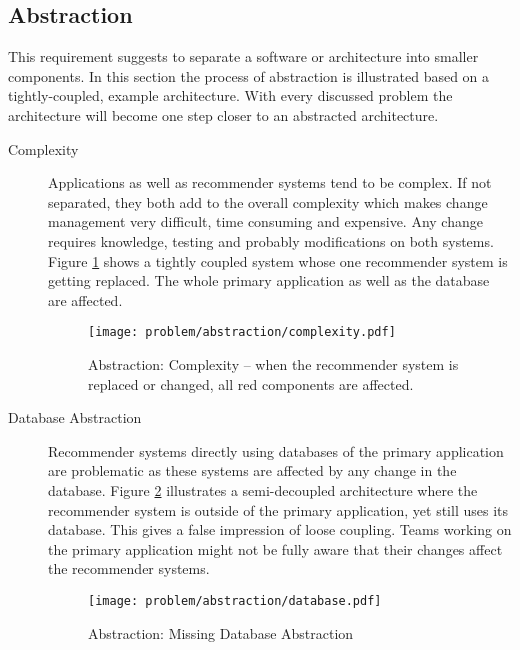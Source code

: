 \subsection{Abstraction}
\label{problem-abstraction}

This requirement suggests to separate a software or architecture into smaller components. In this section the process of abstraction is illustrated based on a tightly-coupled, example architecture. With every discussed problem the architecture will become one step closer to an abstracted architecture. 

\begin{description}

    \item[Complexity] Applications as well as recommender systems tend to be complex. If not separated, they both add to the overall complexity which makes change management very difficult, time consuming and expensive. Any change requires knowledge, testing and probably modifications on both systems. Figure \ref{fig:abstraction-complexity} shows a tightly coupled system whose one recommender system is getting replaced. The whole primary application as well as the database are affected.

    \begin{figure}[H]
        \texttt{[image: problem/abstraction/complexity.pdf]}
        \caption[Abstraction: Complexity]{Abstraction: Complexity -- when the recommender system is replaced or changed, all red components are affected.}
        \label{fig:abstraction-complexity}
    \end{figure}

    \item[Database Abstraction] Recommender systems directly using databases of the primary application are problematic as these systems are affected by any change in the database. Figure \ref{fig:abstraction-database} illustrates a semi-decoupled architecture where the recommender system is outside of the primary application, yet still uses its database. This gives a false impression of loose coupling. Teams working on the primary application might not be fully aware that their changes affect the recommender systems.

    \begin{figure}[H]
        \texttt{[image: problem/abstraction/database.pdf]}
        \caption{Abstraction: Missing Database Abstraction}
        \label{fig:abstraction-database}
    \end{figure}


\end{description}
